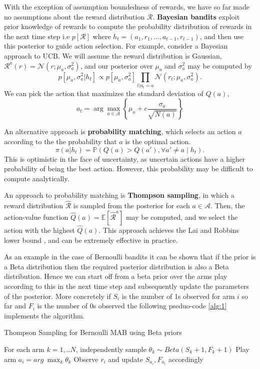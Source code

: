 \documentclass{article}
\newcommand{\E}{\mathbb{E}}                                        %
\begin{document}
With the exception of assumption boundedness of rewards, we have so far made no assumptions about the reward distribution $\mathcal{R}$. \textbf{Bayesian bandits} exploit prior knowledge of rewards to compute the probability distribution of rewards in the next time step i.e  $p[\mathcal{R}]$ where $h_t = (a_1,r_1, \ldots, a_{t-1}, r_{t-1})$, and then use this posterior to guide action selection. For example, consider a Bayesian approach to UCB. We will assume the reward distribution is Gaussian, $\mathcal{R}^a(r) = \mathcal{N}(r; \mu_a, \sigma_a^2)$, and our posterior over $\mu_a$ and $\sigma_a^2$ may be computed by
\begin{equation}
    p[\mu_a, \sigma_a^2 | h_t] \propto p[\mu_a, \sigma_a^2] \prod_{t|a_t = a} \mathcal{N}(r_t; \mu_a,\sigma_a^2).
\end{equation}
We can pick the action that maximizes the standard deviation of $Q(a)$,
\begin{equation}
    a_t = \arg \max_{a \in \mathcal{A}} \left\{ \mu_a + c \frac{\sigma_a}{\sqrt{N(a)}} \right\}
\end{equation}

An alternative approach is \textbf{probability matching}, which selects an action $a$ according to the the probability that $a$ is the optimal action.
\begin{equation}
    \pi(a | h_t) = \mathbb{P}(Q(a) > Q(a') , \forall a' \neq a \mid h_t).
\end{equation}
This is optimistic in the face of uncertainty, as uncertain actions have a higher probability of being the best action. However, this probability may be difficult to compute analytically.

An approach to probability matching is \textbf{Thompson sampling}, in which a reward distribution $\hat{\mathcal{R}}$ is sampled from the posterior for each $a \in \mathcal{A}$. Then, the action-value function $\hat{Q}(a) = \E[\hat{\mathcal{R}}^a]$ may be computed, and we select the action with the highest $\hat{Q}(a)$. This approach achieves the Lai and Robbins lower bound \cite{lai}, and can be extremely effective in practice. 

As an example in the case of Bernoulli bandits it can be shown that if the prior is a Beta distribution then the required posterior distribution is also a Beta distribution.
Hence we can start off from a beta prior over the arms play according to this in the next time step and subsequently update the parameters of the posterior. More concretely if $S_i$ is the number of 1s observed for arm $i$ so far and $F_i$ is the number of 0s observed the following pseduo-code \ref{alg:1} implements the algorithm.
\begin{algorithm}
\caption{Thompson Sampling for Bernoulli MAB using Beta priors}\label{alg:1}
\begin{algorithmic}[1]
\State For each arm $k=1,..N$, independently sample $\theta_k \sim Beta(S_k+1,F_k+1)$
\State Play arm $a_i= arg~\max_k \theta_k$
\State Observe $r_i$ and update $S_{a_i},F_{a_i}$ accordingly
\EndFor
\end{algorithmic}
\end{algorithm}
\end{document}
